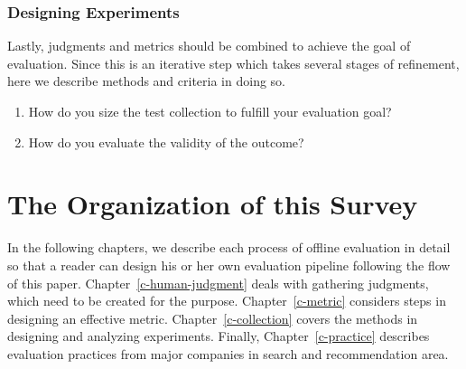\subsubsection{Designing Experiments}


Lastly, judgments and metrics should be combined to achieve the goal of evaluation. Since this is an iterative step which takes several stages of refinement, here we describe methods and criteria in doing so. 

\begin{enumerate}
	\item How do you size the test collection to fulfill your evaluation goal?
	\item How do you evaluate the validity of the outcome?
\end{enumerate}


\section{The Organization of this Survey}

In the following chapters, we describe each process of offline evaluation in detail so that a reader can design his or her own evaluation pipeline following the flow of this paper. Chapter~\ref{c-human-judgment} deals with gathering judgments, which need to be created for the purpose. Chapter~\ref{c-metric} considers steps in designing an effective metric. Chapter~\ref{c-collection} covers the methods in designing and analyzing experiments. Finally, Chapter~\ref{c-practice} describes evaluation practices from major companies in search and recommendation area.

